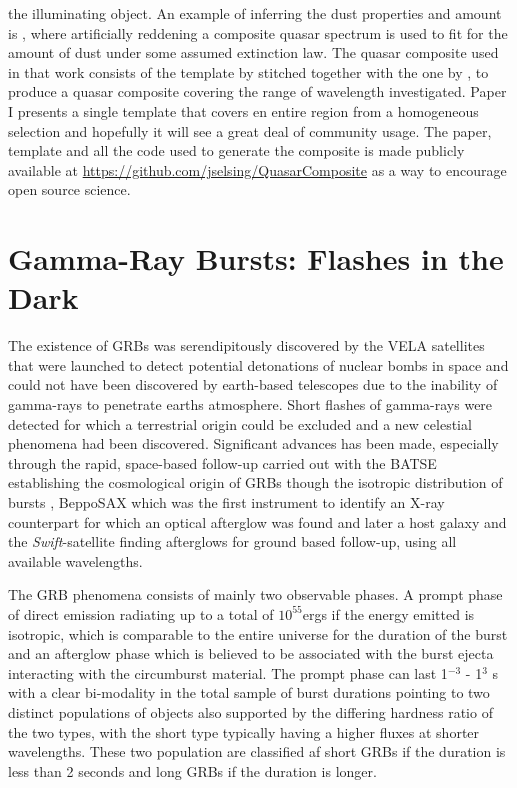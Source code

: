 the illuminating object. An example of inferring the dust properties and amount
is \citet{Krogager2015}, where artificially reddening a composite quasar
spectrum is used to fit for the amount of dust under some assumed extinction
law. The quasar composite used in that work consists of the template by
\citet{Vandenberk2001} stitched together with the one by \citet{Glikman2006}, to
produce a quasar composite covering the range of wavelength investigated. Paper
I presents a single template that covers en entire region from a homogeneous
selection and hopefully it will see a great deal of community usage. The paper,
template and all the code used to generate the composite is made publicly
available at \url{https://github.com/jselsing/QuasarComposite} as a way to
encourage open source science.

\section{Gamma-Ray Bursts: Flashes in the Dark}
\label{sec:intro:grb}


The existence of GRBs was serendipitously discovered by the VELA satellites that were launched to detect potential detonations of nuclear bombs in space and could not have been discovered by earth-based telescopes due to the inability of gamma-rays to penetrate earths atmosphere. Short flashes of gamma-rays were detected for which a terrestrial origin could be excluded and a new celestial phenomena had been discovered. 
Significant advances has been made, especially through the rapid, space-based follow-up carried out with the BATSE \citep{Harmon2004} establishing the cosmological origin of GRBs though the isotropic distribution of bursts \citep{Meegan1992},  BeppoSAX \citep{Boella1997} which was the first instrument to identify an X-ray counterpart  \citep{Costa1997} for which an optical afterglow was found and later a host galaxy and the \textit{Swift}-satellite \citep{Gehrels2004} finding afterglows for ground based follow-up, using all available wavelengths. 

The GRB phenomena consists of mainly two observable phases. A prompt phase of direct emission radiating up to a total of $10^{55} $ergs if the energy emitted is isotropic, which is comparable to the entire universe \citep{Kumar2014} for the duration of the burst and an afterglow phase which is believed to be associated with the burst ejecta interacting with the circumburst material. The prompt phase can last 1$^{-3}$ - 1$^3$ s with a clear bi-modality in the total sample of burst durations pointing to two distinct populations of objects also supported by the differing hardness ratio of the two types, with the short type typically having a higher fluxes at shorter wavelengths. These two population are classified af short GRBs if the duration is less than 2 seconds and long GRBs if the duration is longer. 

